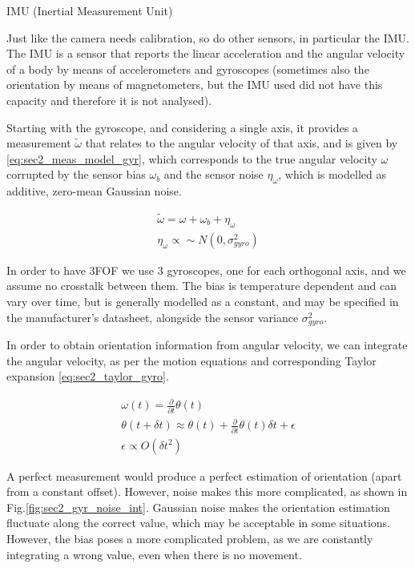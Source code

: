 \documentclass[10pt,twocolumn]{IEEEtran}
\begin{document}
IMU (Inertial Measurement Unit)

Just like the camera needs calibration, so do other sensors, in particular the IMU. The IMU is a sensor that reports the linear acceleration and the angular velocity of a body by means of accelerometers and gyroscopes (sometimes also the orientation by means of magnetometers, but the IMU used did not have this capacity and therefore it is not analysed).

Starting with the gyroscope, and considering a single axis, it provides a measurement $\tilde{\omega}$ that relates to the angular velocity of that axis, and is given by \eqref{eq:sec2_meas_model_gyr}, which corresponds to the true angular velocity $\omega$ corrupted by the sensor bias $\omega_b$ and the sensor noise $\eta_{\omega}$, which is modelled as additive, zero-mean Gaussian noise.

\begin{equation}
    \label{eq:sec2_meas_model_gyr}
    \begin{split}
        \tilde{\omega} = \omega + \omega_b + \eta_\omega\\
        \eta_{\omega} \propto \sim N\left( 0, \sigma_{gyro}^2 \right)
    \end{split}
\end{equation}

In order to have 3FOF we use 3 gyroscopes, one for each orthogonal axis, and we assume no crosstalk between them. The bias is temperature dependent and can vary over time, but is generally modelled as a constant, and may be specified in the manufacturer's datasheet, alongside the sensor variance $\sigma_{gyro}^2$.

In order to obtain orientation information from angular velocity, we can integrate the angular velocity, as per the motion equations and corresponding Taylor expansion \eqref{eq:sec2_taylor_gyro}.

\begin{equation}
    \label{eq:sec2_taylor_gyro}
    \begin{split}
        \omega(t) = \frac{\partial}{\partial t} \theta(t) \\
        \theta(t+\delta t) \approx \theta(t) + \frac{\partial}{\partial t} \theta(t) \delta t + \epsilon\\
        \epsilon \propto O(\delta t^2)
    \end{split}
\end{equation}

A perfect measurement would produce a perfect estimation of orientation (apart from a constant offset). However, noise makes this more complicated, as shown in Fig.\ref{fig:sec2_gyr_noise_int}. Gaussian noise makes the orientation estimation fluctuate along the correct value, which may be acceptable in some situations. However, the bias poses a more complicated problem, as we are constantly integrating a wrong value, even when there is no movement.
\end{document}
